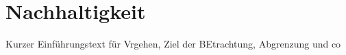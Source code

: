 \documentclass[main.tex]{subfiles} %
\begin{document}

\section{Nachhaltigkeit}

Kurzer Einführungstext für Vrgehen, Ziel der BEtrachtung, Abgrenzung und co


\newpage


\newpage


\newpage
\end{document}
